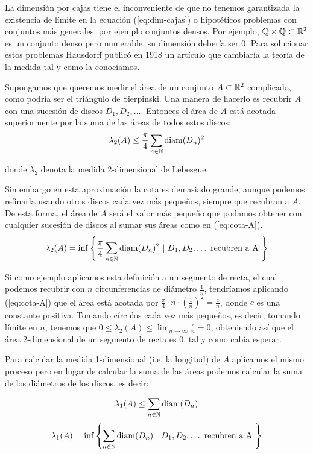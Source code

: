 La dimensión por cajas tiene el inconveniente de que no tenemos garantizada la existencia de límite en la ecuación (\ref{eq:dim-cajas}) o hipotéticos problemas con conjuntos más generales, por ejemplo conjuntos densos. Por ejemplo, $\mathbb{Q}\times\mathbb{Q}\subset\mathbb{R}^2$ es un conjunto denso pero numerable, su dimensión debería ser 0. Para solucionar estos problemas Hausdorff publicó en 1918 un artículo que cambiaría la teoría de la medida tal y como la conocíamos. 

Supongamos que queremos medir el área de un conjunto $A\subset\mathbb{R}^2$ complicado, como podría ser el triángulo de Sierpinski. Una manera de hacerlo es recubrir $A$ con una sucesión de discos $D_1,D_2,\dots$. Entonces el área de $A$ está acotada superiormente por la suma de las áreas de todos estos discos:
\begin{equation}\label{eq:cota-A}
\lambda_2(A)\leq \frac \pi 4 \sum_{n\in\mathbb{N}}\mathrm{diam}(D_n)^2
\end{equation}

donde $\lambda_2$ denota la medida 2-dimensional de Lebesgue.

Sin embargo en esta aproximación la cota es demasiado grande, aunque podemos refinarla usando otros discos cada vez más pequeños, siempre que recubran a $A$. De esta forma, el área de $A$ será el valor más pequeño que podamos obtener con cualquier sucesión de discos al sumar sus áreas como en (\ref{eq:cota-A}).
\begin{equation}
\lambda_2(A)=\inf\left\lbrace \frac \pi 4 \sum_{n\in\mathbb{N}}\mathrm{diam}(D_n)^2 \ | \  D_1,D_2,\dots \text{ recubren a A }\right\rbrace
\end{equation}

Si como ejemplo aplicamos esta definición a un segmento de recta, el cual podemos recubrir con $n$ circunferencias de diámetro $\frac 1 n$, tendríamos aplicando (\ref{eq:cota-A}) que el área está acotada por $\frac \pi 4 \cdot n \cdot \left(\frac 1 n\right)^2=\frac c n$, donde $c$ es una constante positiva. Tomando círculos cada vez más pequeños, es decir, tomando límite en $n$, tenemos que $0 \leq \lambda_2(A) \leq \lim_{n\rightarrow\infty}\frac c n = 0$, obteniendo así que el área 2-dimensional de un segmento de recta es 0, tal y como cabía esperar.

Para calcular la medida 1-dimensional (i.e. la longitud) de $A$ aplicamos el mismo proceso pero en lugar de calcular la suma de las áreas podemos calcular la suma de los diámetros de los discos, es decir:

$$
\lambda_1(A)\leq\sum_{n\in\mathbb{N}}\mathrm{diam}(D_n) 
$$
$$
\lambda_1(A)=\inf\left\lbrace \sum_{n\in\mathbb{N}}\mathrm{diam}(D_n) \ | \  D_1,D_2,\dots \text{ recubren a A }\right\rbrace 
$$

